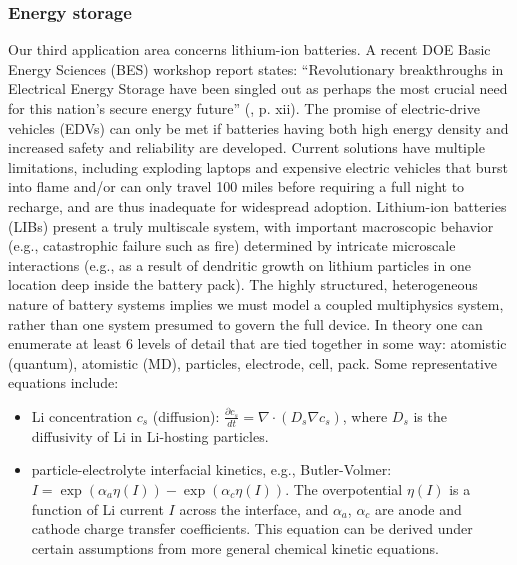 \documentclass[11pt]{article}
\newcommand{\MarginPar}[1]{\marginpar{%
\vskip-\baselineskip %
\raggedright\tiny\sffamily
\hrule\smallskip{\color{red}#1}\par\smallskip\hrule}}
\begin{document}
\subsubsection*{Energy storage}
Our third application area concerns lithium-ion batteries.
A recent DOE Basic Energy Sciences (BES) workshop report states: 
``Revolutionary breakthroughs in Electrical Energy Storage have been singled out as perhaps the most crucial need
for this nation's secure energy future''  (\cite{ees_rpt}, p. xii).
The promise of electric-drive vehicles (EDVs) can only be met if batteries having both high energy density and increased safety 
and reliability are developed.  Current solutions have multiple limitations, including exploding laptops and expensive electric vehicles that burst into 
flame and/or can only travel 100 miles before requiring a full night to recharge, and are thus inadequate for widespread adoption.  
Lithium-ion batteries (LIBs) present a truly multiscale system, with important macroscopic behavior
(e.g., catastrophic failure such as fire) determined by intricate microscale
interactions (e.g., as a result of dendritic growth on lithium particles in
one location deep inside the battery pack). 
The highly structured, heterogeneous nature of battery systems implies we must model a coupled multiphysics system, rather
than one system presumed to govern the full device.   
In theory one can enumerate at least 6 levels of detail that are tied together in some way: 
atomistic (quantum), atomistic (MD), particles, electrode, cell, pack.   Some
representative equations include:\\

\begin{itemize}\itemsep -0.0em
\item
Li concentration $c_s$ (diffusion): $\frac{\partial c_s}{dt} = \nabla \cdot (D_s \nabla c_s)$, where
$D_s$ is the diffusivity of Li in Li-hosting particles.
\item
particle-electrolyte interfacial kinetics, e.g., Butler-Volmer: $I = \exp(\alpha_a \eta(I)) - \exp(\alpha_c \eta(I))$.  The overpotential $\eta(I)$ is a function of Li current $I$ across the interface, and $\alpha_a$, $\alpha_c$
are anode and cathode charge transfer coefficients.  This equation can be derived under certain assumptions from more general chemical kinetic equations.
\end{itemize}
\end{document}
